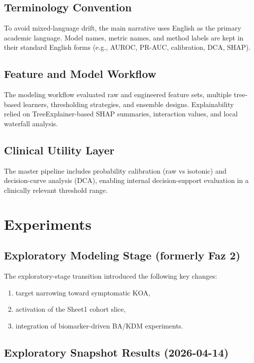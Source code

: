 ﻿\documentclass[11pt,a4paper]{article}
\begin{document}
\subsection{Terminology Convention}

To avoid mixed-language drift, the main narrative uses English as the primary academic
language. Model names, metric names, and method labels are kept in their standard
English forms (e.g., AUROC, PR-AUC, calibration, DCA, SHAP).

\subsection{Feature and Model Workflow}

The modeling workflow evaluated raw and engineered feature sets, multiple tree-based
learners, thresholding strategies, and ensemble designs. Explainability relied on
TreeExplainer-based SHAP summaries, interaction values, and local waterfall analysis.

\subsection{Clinical Utility Layer}

The master pipeline includes probability calibration (raw vs isotonic) and decision-curve
analysis (DCA), enabling internal decision-support evaluation in a clinically relevant
threshold range.

\section{Experiments}

\subsection{Exploratory Modeling Stage (formerly Faz 2)}

The exploratory-stage transition introduced the following key changes:

\begin{enumerate}
  \item target narrowing toward symptomatic KOA,
  \item activation of the Sheet1 cohort slice,
  \item integration of biomarker-driven BA/KDM experiments.
\end{enumerate}

\subsection{Exploratory Snapshot Results (2026-04-14)}
\end{document}
